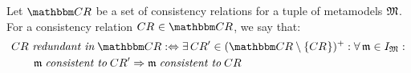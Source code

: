 \begin{definition}
\label{def:redundancy}
    Let $\consistencyrelationset{CR}$ be a set of consistency relations for a tuple of metamodels $\metamodeltuple{M}$. %
    For a consistency relation $\consistencyrelation{CR}{} \in \consistencyrelationset{CR}$, we say that:
    \begin{align*}
        &
        \consistencyrelation{CR}{} \redundantinmath \consistencyrelationset{CR} \equivalentperdefinition %
        \exists \consistencyrelation{CR}{}' \in \transitiveclosure{(\consistencyrelationset{CR} \setminus \setted{\consistencyrelation{CR}{}})} : 
        \forall \modeltuple{m} \in \metamodeltupleinstanceset{M} :\\
        & \formulaskip\formulaskip
        \modeltuple{m} \consistenttomath \consistencyrelation{CR}{}' \Rightarrow \modeltuple{m} \consistenttomath \consistencyrelation{CR}{}
    \end{align*}

\end{definition}
